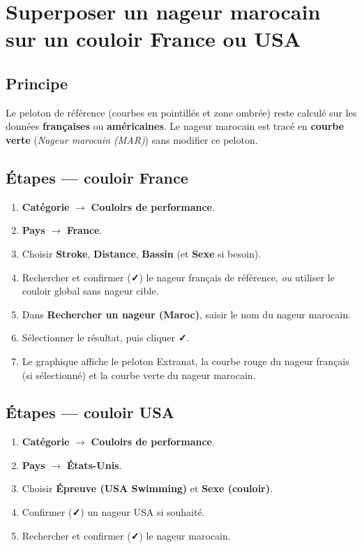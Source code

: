 \documentclass[11pt,a4paper]{article}
\newcommand{\checkmark}{\textbf{✓}}
\begin{document}
\section{Superposer un nageur marocain sur un couloir France ou USA}
\label{sec:overlay}

\subsection{Principe}

Le peloton de référence (courbes en pointillés et zone ombrée) reste calculé sur les données \textbf{françaises} ou \textbf{américaines}. Le nageur marocain est tracé en \textbf{courbe verte} (\emph{Nageur marocain (MAR)}) sans modifier ce peloton.

\subsection{Étapes --- couloir France}

\begin{enumerate}
  \item \textbf{Catégorie} $\rightarrow$ \textbf{Couloirs de performance}.
  \item \textbf{Pays} $\rightarrow$ \textbf{France}.
  \item Choisir \textbf{Stroke}, \textbf{Distance}, \textbf{Bassin} (et \textbf{Sexe} si besoin).
  \item Rechercher et confirmer (\checkmark{}) le nageur français de référence, \emph{ou} utiliser le couloir global sans nageur cible.
  \item Dans \textbf{Rechercher un nageur (Maroc)}, saisir le nom du nageur marocain.
  \item Sélectionner le résultat, puis cliquer \checkmark{}.
  \item Le graphique affiche le peloton Extranat, la courbe rouge du nageur français (si sélectionné) et la courbe verte du nageur marocain.
\end{enumerate}

\subsection{Étapes --- couloir USA}

\begin{enumerate}
  \item \textbf{Catégorie} $\rightarrow$ \textbf{Couloirs de performance}.
  \item \textbf{Pays} $\rightarrow$ \textbf{États-Unis}.
  \item Choisir \textbf{Épreuve (USA Swimming)} et \textbf{Sexe (couloir)}.
  \item Confirmer (\checkmark{}) un nageur USA si souhaité.
  \item Rechercher et confirmer (\checkmark{}) le nageur marocain.
\end{enumerate}
\end{document}
